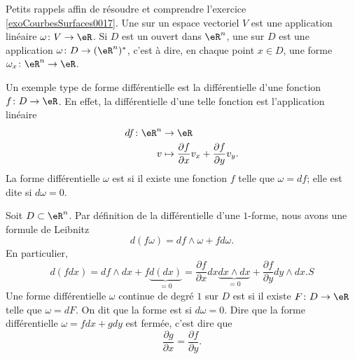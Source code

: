 Petits rappels affin de résoudre et comprendre l'exercice \ref{exoCourbesSurfaces0017}. Une  sur un espace vectoriel $V$ est une application linéaire $\omega\colon V\to \eR$. Si $D$ est un ouvert dans $\eR^n$, une  sur $D$ est une application $\omega\colon D\to (\eR^n)^*$, c'est à dire, en chaque point $x\in D$, une forme $\omega_x\colon \eR^n\to \eR$.

Un exemple type de forme différentielle est la différentielle d'une fonction $f\colon D\to \eR$. En effet, la différentielle d'une telle fonction est l'application linéaire
\begin{equation}
    \begin{aligned}
        df\colon \eR^n&\to \eR \\
        v&\mapsto \frac{ \partial f }{ \partial x }v_x+\frac{ \partial f }{ \partial y }v_y. 
    \end{aligned}
\end{equation}
La forme différentielle $\omega$ est  si il existe une fonction $f$ telle que $\omega=df$; elle est dite  si $d\omega=0$.

Soit $D\subset\eR^n$. Par définition de la différentielle d'une $1$-forme, nous avons une formule de Leibnitz
\begin{equation}
    d(f\omega)=df\wedge\omega+fd\omega.
\end{equation}
En particulier,
\begin{equation}
    d(fdx)=df\wedge dx+f\underbrace{d(dx)}_{=0}=\frac{ \partial f }{ \partial x }dx\underbrace{dx\wedge dx}_{=0}+\frac{ \partial f }{ \partial y }dy\wedge dx. S
\end{equation}
Une forme différentielle $\omega$ continue de degré $1$ sur $D$ est  si il existe $F\colon D\to \eR$ telle que $\omega=dF$. On dit que la forme est  si $d\omega=0$. Dire que la forme différentielle $\omega=fdx+gdy$ est fermée, c'est dire que
\begin{equation}
    \frac{ \partial g }{ \partial x }=\frac{ \partial f }{ \partial y }.
\end{equation}

